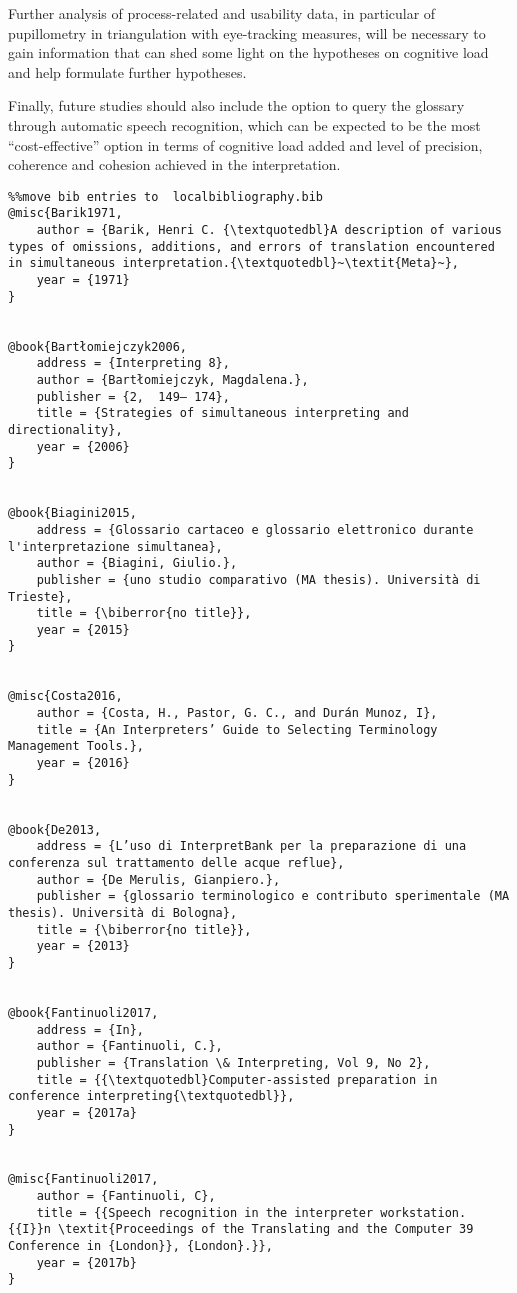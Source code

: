 \documentclass[output=paper]{langsci/langscibook}
\begin{document}
Further analysis of process-related and usability data, in particular of pupillometry in triangulation with eye-tracking measures, will be necessary to gain information that can shed some light on the hypotheses on cognitive load and help formulate further hypotheses.

Finally, future studies should also include the option to query the glossary through automatic speech recognition, which can be expected to be the most “cost-effective” option in terms of cognitive load added and level of precision, coherence and cohesion achieved in the interpretation.

\begin{verbatim}%%move bib entries to  localbibliography.bib
@misc{Barik1971,
	author = {Barik, Henri C. {\textquotedbl}A description of various types of omissions, additions, and errors of translation encountered in simultaneous interpretation.{\textquotedbl}~\textit{Meta}~},
	year = {1971}
}


@book{Bartłomiejczyk2006,
	address = {Interpreting 8},
	author = {Bartłomiejczyk, Magdalena.},
	publisher = {2,  149– 174},
	title = {Strategies of simultaneous interpreting and directionality},
	year = {2006}
}


@book{Biagini2015,
	address = {Glossario cartaceo e glossario elettronico durante l'interpretazione simultanea},
	author = {Biagini, Giulio.},
	publisher = {uno studio comparativo (MA thesis). Università di Trieste},
	title = {\biberror{no title}},
	year = {2015}
}


@misc{Costa2016,
	author = {Costa, H., Pastor, G. C., and Durán Munoz, I},
	title = {An Interpreters’ Guide to Selecting Terminology Management Tools.},
	year = {2016}
}


@book{De2013,
	address = {L’uso di InterpretBank per la preparazione di una conferenza sul trattamento delle acque reflue},
	author = {De Merulis, Gianpiero.},
	publisher = {glossario terminologico e contributo sperimentale (MA thesis). Università di Bologna},
	title = {\biberror{no title}},
	year = {2013}
}


@book{Fantinuoli2017,
	address = {In},
	author = {Fantinuoli, C.},
	publisher = {Translation \& Interpreting, Vol 9, No 2},
	title = {{\textquotedbl}Computer-assisted preparation in conference interpreting{\textquotedbl}},
	year = {2017a}
}


@misc{Fantinuoli2017,
	author = {Fantinuoli, C},
	title = {{Speech recognition in the interpreter workstation. {{I}}n \textit{Proceedings of the Translating and the Computer 39 Conference in {London}}, {London}.}},
	year = {2017b}
}



\end{verbatim}
\end{document}
